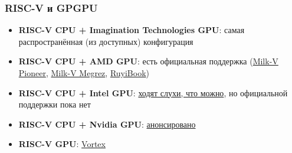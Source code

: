 \documentclass[xcolor=table,aspectratio=169]{beamer}
\begin{document}
\begin{frame}[fragile]
  \frametitle{RISC-V и GPGPU}
  \begin{itemize}
    \item \textbf{RISC-V CPU + Imagination Technologies GPU}: самая распространённая (из доступных) конфигурация
    \item \textbf{RISC-V CPU + AMD GPU}: есть официальная поддержка (\href{https://milkv.io/pioneer}{Milk-V Pioneer}, \href{https://riscv.org/ecosystem-news/2024/10/risc-v-cpu-demoed-with-rx-7900-xtx-gpu-in-debian-linux-amd-flagship-gpu-paired-with-milk-v-megrez-board-and-sifive-p550-cores/}{Milk-V Megrez}, \href{https://milkv.io/ruyibook}{RuyiBook})
    \item \textbf{RISC-V CPU + Intel GPU}: \href{https://www.reddit.com/r/RISCV/comments/1ftep9u/intel_arc_a770_on_riscv/}{ходят слухи, что можно}, но официальной поддержки пока нет
    \item \textbf{RISC-V CPU + Nvidia GPU}: \href{https://riscv.org/ecosystem-news/2025/07/nvidia-to-bring-cuda-platform-support-to-the-risc-v/}{анонсировано}
    \item \textbf{RISC-V GPU}: \href{https://github.com/vortexgpgpu/vortex}{Vortex}
  \end{itemize}
\end{frame}
\end{document}
